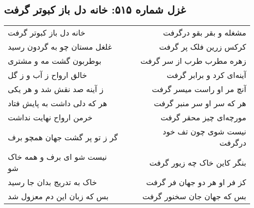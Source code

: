 \begin{center}
\section*{غزل شماره ۵۱۵: خانه دل باز کبوتر گرفت}
\label{sec:0515}
\begin{longtable}{l p{0.5cm} r}
خانه دل باز کبوتر گرفت
&&
مشغله و بقر بقو درگرفت
\\
غلغل مستان چو به گردون رسید
&&
کرکس زرین فلک پر گرفت
\\
بوطربون گشت مه و مشتری
&&
زهره مطرب طرب از سر گرفت
\\
خالق ارواح ز آب و ز گل
&&
آینه‌ای کرد و برابر گرفت
\\
ز آینه صد نقش شد و هر یکی
&&
آنچ مر او راست میسر گرفت
\\
هر که دلی داشت به پایش فتاد
&&
هر که سر او سر منبر گرفت
\\
خرمن ارواح نهایت نداشت
&&
مورچه‌ای چیز محقر گرفت
\\
گر ز تو پر گشت جهان همچو برف
&&
نیست شوی چون تف خود درگرفت
\\
نیست شو ای برف و همه خاک شو
&&
بنگر کاین خاک چه زیور گرفت
\\
خاک به تدریج بدان جا رسید
&&
کز فر او هر دو جهان فر گرفت
\\
بس که زبان این دم معزول شد
&&
بس که جهان جان سخنور گرفت
\\
\end{longtable}
\end{center}
